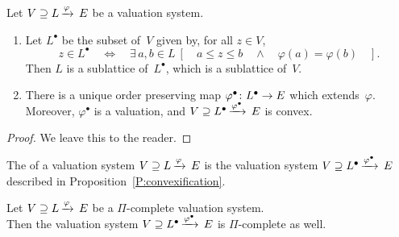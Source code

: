 \documentclass[main.tex]{subfiles}
\begin{document}
%
%
\begin{prop}
\label{P:convex-completion}
\label{P:convexification}
Let $V \supseteq L\,\smash{\xrightarrow{\varphi}\,E}$ be a valuation system.
\begin{enumerate}
\item
Let $L^\bullet$ be the subset of~$V$ given by,
for all $z\in V$,
\begin{equation*}
z\in L^\bullet \quad\iff\quad
\exists\, a,b\in L\ [
\quad a\leq z\leq b \quad\wedge\quad \varphi(a) = \varphi(b)\quad].
\end{equation*}
Then $L$ is a sublattice of~$L^\bullet$, which is a sublattice of~$V$.

\item
There is a unique order preserving map $\varphi^\bullet\colon L^\bullet\rightarrow E$
which extends~$\varphi$.\\
Moreover, $\varphi^\bullet$
is a valuation,
and  $V \supseteq L^\bullet\,\smash{\xrightarrow{\varphi^\bullet}\,E}$ is convex.
\end{enumerate}
\end{prop}
\begin{proof}
We leave this to the reader.
\end{proof}
\begin{dfn}
\label{D:convexification}
The 
of a valuation system $V \supseteq L\,\smash{\xrightarrow{\varphi}\,E}$ 
is the valuation system
 $V \supseteq L^\bullet\,\smash{\xrightarrow{\varphi^\bullet}\,E}$ 
described in Proposition~\ref{P:convexification}.
\end{dfn}
%
%
\begin{prop}
\label{P:convexification_versus_pi-completion}
Let $V \supseteq L\,\smash{\xrightarrow{\varphi}\,E}$ be a $\Pi$-complete valuation system.\\
Then 
the valuation system 
$V \supseteq L^\bullet\,\smash{\xrightarrow{\varphi^\bullet}\,E}$ is $\Pi$-complete as well.
\end{prop}
\end{document}
